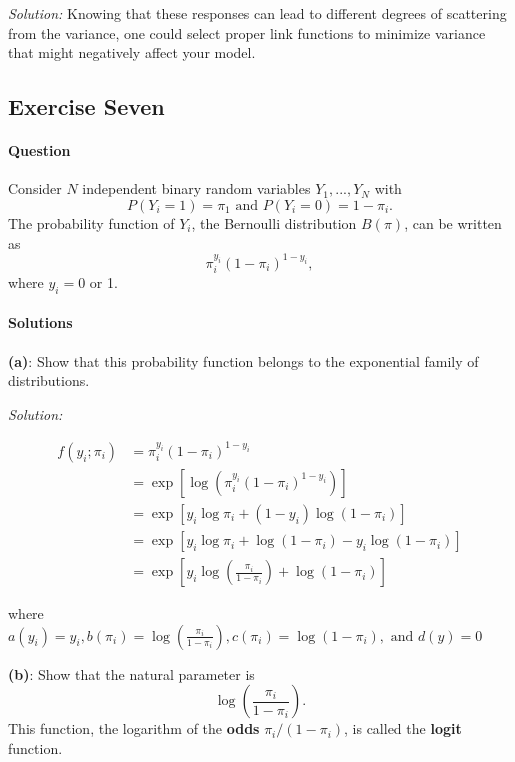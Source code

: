 \documentclass[]{article}
\let\oldparagraph\paragraph
\renewcommand{\paragraph}[1]{\oldparagraph{#1}\mbox{}}
\begin{document}
\emph{Solution: } Knowing that these responses can lead to different
degrees of scattering from the variance, one could select proper link
functions to minimize variance that might negatively affect your model.

\pagebreak

\subsection{Exercise Seven}\label{exercise-seven}

\paragraph{Question}\label{question-3}

Consider \(N\) independent binary random variables \(Y_1,...,Y_N\) with
\[P(Y_i = 1) = \pi_1 \text{ and } P(Y_i = 0) = 1 - \pi_i.\] The
probability function of \(Y_i\), the Bernoulli distribution \(B(\pi)\),
can be written as \[\pi_i^{y_i} (1 - \pi_i)^{1 - y_i},\] where
\(y_i = 0\) or 1.

\paragraph{Solutions}\label{solutions-3}

\textbf{(a)}: Show that this probability function belongs to the
exponential family of distributions.

\emph{Solution: }

\begin{align*}
f(y_i; \pi_i) &= \pi_i^{y_i} (1 - \pi_i)^{1 - y_i}\\
              &= \exp[\log(\pi_i^{y_i} (1 - \pi_i)^{1 - y_i})]\\
              &= \exp[y_i\log\pi_i + (1-y_i)\log(1-\pi_i)]\\
              &= \exp[y_i\log\pi_i + \log(1-\pi_i) - y_i\log(1-\pi_i)]\\
              &= \exp[y_i\log\left(\frac{\pi_i}{1-\pi_i}\right) + \log(1-\pi_i)]
\end{align*}

where
\(a(y_i) = y_i, b(\pi_i) = \log\left(\frac{\pi_i}{1-\pi_i}\right), c(\pi_i) = \log(1-\pi_i),\text{ and } d(y) = 0\)

\textbf{(b)}: Show that the natural parameter is
\[\log \left(\frac{\pi_i}{1 - \pi_i}\right).\] This function, the
logarithm of the \textbf{odds} \(\pi_i/(1 - \pi_i)\), is called the
\textbf{logit} function.
\end{document}
